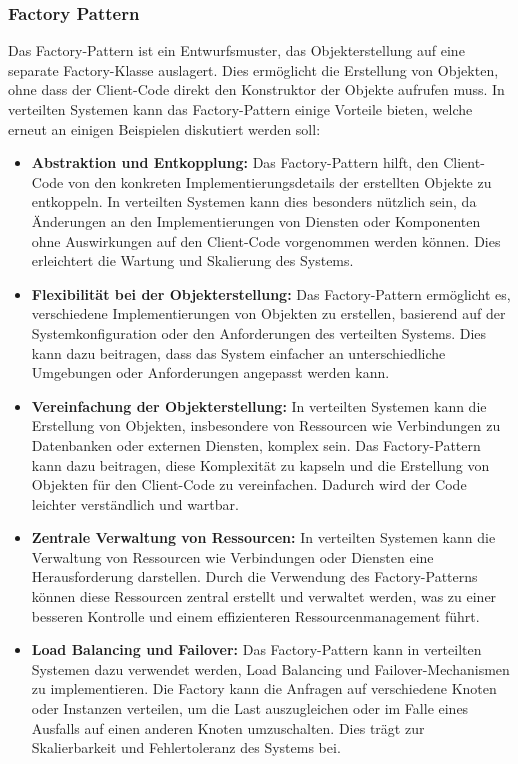 \documentclass[../vs-script-first-v01.tex]{subfiles}
\begin{document}
\subsubsection{Factory Pattern}
Das Factory-Pattern ist ein Entwurfsmuster, das Objekterstellung auf eine separate Factory-Klasse auslagert. Dies ermöglicht die Erstellung von Objekten, ohne dass der Client-Code direkt den Konstruktor der Objekte aufrufen muss. In verteilten Systemen kann das Factory-Pattern einige Vorteile bieten, welche erneut an einigen Beispielen diskutiert werden soll:
\begin{itemize}
\item \textbf{Abstraktion und Entkopplung:} Das Factory-Pattern hilft, den Client-Code von den konkreten Implementierungsdetails der erstellten Objekte zu entkoppeln. In verteilten Systemen kann dies besonders nützlich sein, da Änderungen an den Implementierungen von Diensten oder Komponenten ohne Auswirkungen auf den Client-Code vorgenommen werden können. Dies erleichtert die Wartung und Skalierung des Systems.
\item \textbf{Flexibilität bei der Objekterstellung:} Das Factory-Pattern ermöglicht es, verschiedene Implementierungen von Objekten zu erstellen, basierend auf der Systemkonfiguration oder den Anforderungen des verteilten Systems. Dies kann dazu beitragen, dass das System einfacher an unterschiedliche Umgebungen oder Anforderungen angepasst werden kann.
\item \textbf{Vereinfachung der Objekterstellung:} In verteilten Systemen kann die Erstellung von Objekten, insbesondere von Ressourcen wie Verbindungen zu Datenbanken oder externen Diensten, komplex sein. Das Factory-Pattern kann dazu beitragen, diese Komplexität zu kapseln und die Erstellung von Objekten für den Client-Code zu vereinfachen. Dadurch wird der Code leichter verständlich und wartbar.
\item \textbf{Zentrale Verwaltung von Ressourcen:} In verteilten Systemen kann die Verwaltung von Ressourcen wie Verbindungen oder Diensten eine Herausforderung darstellen. Durch die Verwendung des Factory-Patterns können diese Ressourcen zentral erstellt und verwaltet werden, was zu einer besseren Kontrolle und einem effizienteren Ressourcenmanagement führt.
\item \textbf{Load Balancing und Failover:} Das Factory-Pattern kann in verteilten Systemen dazu verwendet werden, Load Balancing und Failover-Mechanismen zu implementieren. Die Factory kann die Anfragen auf verschiedene Knoten oder Instanzen verteilen, um die Last auszugleichen oder im Falle eines Ausfalls auf einen anderen Knoten umzuschalten. Dies trägt zur Skalierbarkeit und Fehlertoleranz des Systems bei.
\end{itemize}
\end{document}
